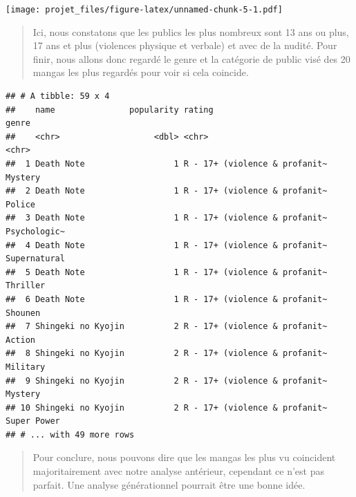 \documentclass[]{article}
\newenvironment{Shaded}{\begin{snugshade}}{\end{snugshade}}
\newcommand{\DecValTok}[1]{\textcolor[rgb]{0.00,0.00,0.81}{#1}}
\newcommand{\KeywordTok}[1]{\textcolor[rgb]{0.13,0.29,0.53}{\textbf{#1}}}
\newcommand{\NormalTok}[1]{#1}
\newcommand{\OperatorTok}[1]{\textcolor[rgb]{0.81,0.36,0.00}{\textbf{#1}}}
\newcommand{\StringTok}[1]{\textcolor[rgb]{0.31,0.60,0.02}{#1}}
\begin{document}
\texttt{[image: projet\_files/figure-latex/unnamed-chunk-5-1.pdf]}

\begin{quote}
Ici, nous constatons que les publics les plus nombreux sont 13 ans ou
plus, 17 ans et plus (violences physique et verbale) et avec de la
nudité. Pour finir, nous allons donc regardé le genre et la catégorie de
public visé des 20 mangas les plus regardés pour voir si cela coincide.
\end{quote}

\begin{Shaded}
\end{Shaded}

\begin{verbatim}
## # A tibble: 59 x 4
##    name               popularity rating                        genre       
##    <chr>                   <dbl> <chr>                         <chr>       
##  1 Death Note                  1 R - 17+ (violence & profanit~ Mystery     
##  2 Death Note                  1 R - 17+ (violence & profanit~ Police      
##  3 Death Note                  1 R - 17+ (violence & profanit~ Psychologic~
##  4 Death Note                  1 R - 17+ (violence & profanit~ Supernatural
##  5 Death Note                  1 R - 17+ (violence & profanit~ Thriller    
##  6 Death Note                  1 R - 17+ (violence & profanit~ Shounen     
##  7 Shingeki no Kyojin          2 R - 17+ (violence & profanit~ Action      
##  8 Shingeki no Kyojin          2 R - 17+ (violence & profanit~ Military    
##  9 Shingeki no Kyojin          2 R - 17+ (violence & profanit~ Mystery     
## 10 Shingeki no Kyojin          2 R - 17+ (violence & profanit~ Super Power 
## # ... with 49 more rows
\end{verbatim}

\begin{quote}
Pour conclure, nous pouvons dire que les mangas les plus vu coincident
majoritairement avec notre analyse antérieur, cependant ce n'est pas
parfait. Une analyse générationnel pourrait être une bonne idée.
\end{quote}
\end{document}
